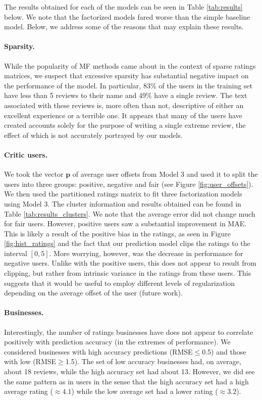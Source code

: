 \documentclass[12pt]{article}
\newcommand{\mbf}[1]{\mathbf{#1}}
\begin{document}
The results obtained for each of the models can be seen in Table \ref{tab:results} below. We note that the factorized models fared worse than the simple baseline model. Below, we address some of the reasons that may explain these results.

\paragraph{Sparsity.} While the popularity of MF methods came about in the context of sparse ratings matrices, we suspect that excessive sparsity has substantial negative impact on the performance of the model. In particular, 83\% of the users in the training set have less than 5 reviews to their name and 49\% have a single review. The text associated with these reviews is, more often than not, descriptive of either an excellent experience or a terrible one. It appears that many of the users have created accounts solely for the purpose of writing a single extreme review, the effect of which is not accurately portrayed by our models.

\paragraph{Critic users.} We took the vector $\mbf p$ of average user offsets from Model 3 and used it to split the users into three groups: positive, negative and fair (see Figure \ref{fig:user_offsets}). We then used the partitioned ratings matrix to fit three factorization models using Model 3. The cluster information and results obtained can be found in Table \ref{tab:results_clusters}. We note that the average error did not change much for fair users. However, positive users saw a substantial improvement in MAE. This is likely a result of the positive bias in the ratings, as seen in Figure \ref{fig:hist_ratings} and the fact that our prediction model clips the ratings to the interval $[0,5]$. More worrying, however, was the decrease in performance for negative users. Unlike with the positive users, this does not appear to result from clipping, but rather from intrinsic variance in the ratings from these users. This suggests that it would be useful to employ different levels of regularization depending on the average offset of the user (future work).

\paragraph{Businesses.} Interestingly, the number of ratings businesses have does not appear to correlate positively with prediction accuracy (in the extremes of performance). We considered businesses with high accuracy predictions (RMSE$\leq$0.5) and those with low (RMSE$\geq$1.5). The set of low accuracy businesses had, on average, about 18 reviews, while the high accuracy set had about 13. However, we did see the same pattern as in users in the sense that the high accuracy set had a high average rating ($\approx4.1$) while the low average set had a lower rating ($\approx3.2$).
\end{document}
